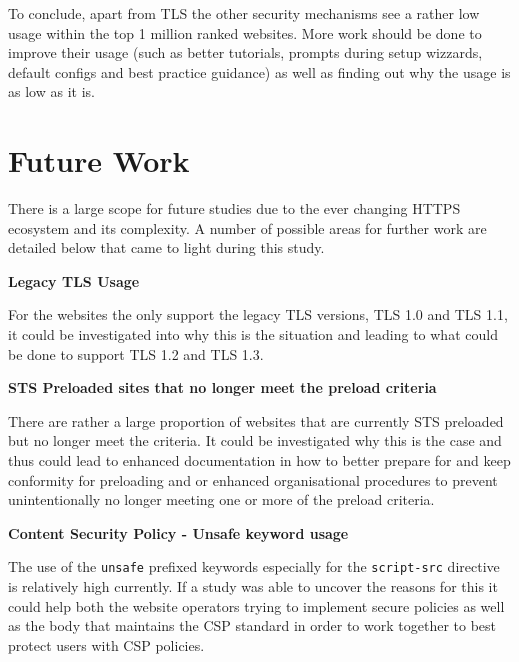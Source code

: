 \documentclass{mscreport}
\begin{document}
\vspace{0.3cm} \noindent
To conclude, apart from TLS the other security mechanisms see a rather low usage within the top 1 million ranked websites. More work should be done to improve their usage (such as better tutorials, prompts during setup wizzards, default configs and best practice guidance) as well as finding out why the usage is as low as it is.

\newpage

\section{Future Work}

\vspace{0.3cm} \noindent
There is a large scope for future studies due to the ever changing HTTPS ecosystem and its complexity. A number of possible areas for further work are detailed below that came to light during this study.

\vspace{0.7cm} \noindent
\textbf{Legacy TLS Usage}

\noindent
For the websites the only support the legacy TLS versions, TLS 1.0 and TLS 1.1, it could be investigated into why this is the situation and leading to what could be done to support TLS 1.2 and TLS 1.3.

\vspace{0.7cm} \noindent
\textbf{STS Preloaded sites that no longer meet the preload criteria}

\noindent
There are rather a large proportion of websites that are currently STS preloaded but no longer meet the criteria. It could be investigated why this is the case and thus could lead to enhanced documentation in how to better prepare for and keep conformity for preloading and or enhanced organisational procedures to prevent unintentionally no longer meeting one or more of the preload criteria.

\vspace{0.7cm} \noindent
\textbf{Content Security Policy - Unsafe keyword usage}

\noindent
The use of the \texttt{unsafe} prefixed keywords especially for the \texttt{script-src} directive is relatively high currently. If a study was able to uncover the reasons for this it could help both the website operators trying to implement secure policies as well as the body that maintains the CSP standard in order to work together to best protect users with CSP policies.  
\end{document}
